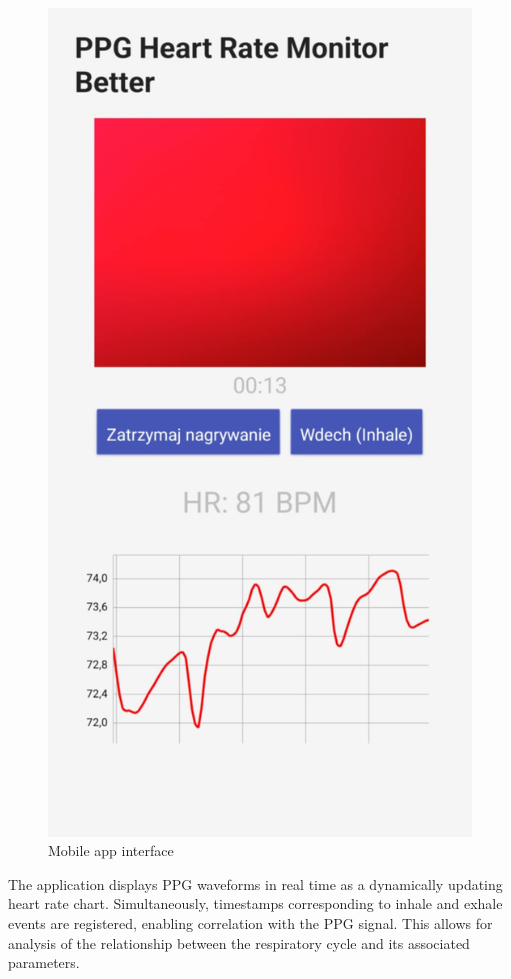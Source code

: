 \documentclass[journal]{IEEEtran}
\begin{document}
\begin{figure}[htbp]
    \centering
    \includegraphics[scale=0.17]{aplikacja.png}
    \caption{Mobile app interface}
    \label{fig:aplikacja_mobilna}
\end{figure}


The application displays PPG waveforms in real time as a dynamically updating heart rate chart. Simultaneously, timestamps corresponding to inhale and exhale events are registered, enabling correlation with the PPG signal. This allows for analysis of the relationship between the respiratory cycle and its associated parameters.
\end{document}
